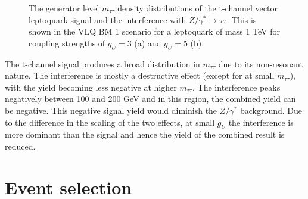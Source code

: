 \begin{figure}[t]
\centering
\caption[Plots of the vector leptoquark generator level $m_{\tau\tau}$ distributions, when changing $g_{U}$.]{The generator level $m_{\tau\tau}$ density distributions of the t-channel vector leptoquark signal and the interference with $Z/\gamma^* \rightarrow \tau\tau$. This is shown in the VLQ BM 1 scenario for a leptoquark of mass 1 TeV for coupling strengths of $g_{U}=3$ (a) and $g_{U}=5$ (b).}
\label{fig:vlq_signal}
\end{figure}

The t-channel signal produces a broad distribution in $m_{\tau\tau}$ due to its non-resonant nature.
The interference is mostly a destructive effect (except for at small $m_{\tau\tau}$), with the yield becoming less negative at higher $m_{\tau\tau}$.
The interference peaks negatively between 100 and 200 GeV and in this region, the combined yield can be negative.
This negative signal yield would diminish the $Z/\gamma^{*}$ background.
Due to the difference in the scaling of the two effects, at small $g_{U}$ the interference is more dominant than the signal and hence the yield of the combined result is reduced.

\section{Event selection}

